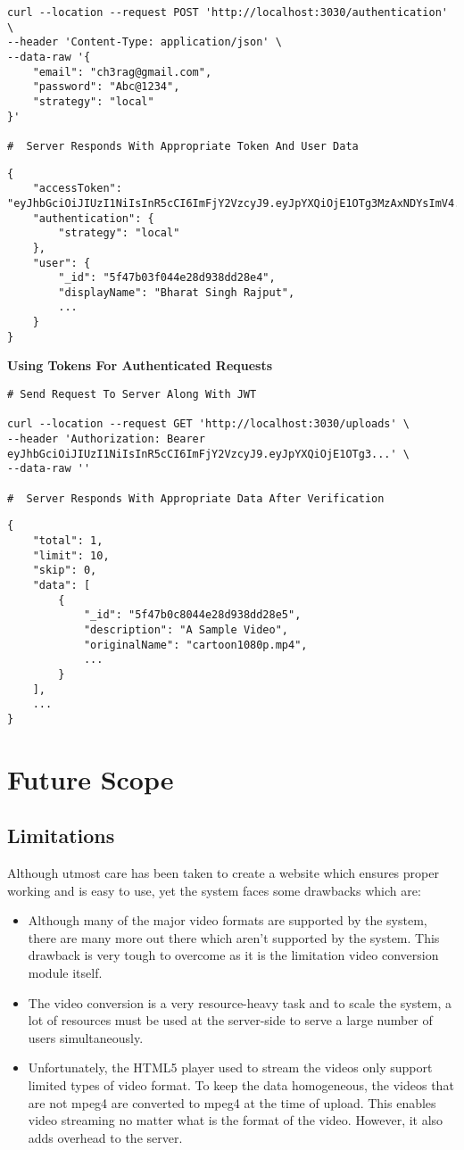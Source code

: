 \begin{itemize}
\begin{verbatim}
curl --location --request POST 'http://localhost:3030/authentication' \
--header 'Content-Type: application/json' \
--data-raw '{
	"email": "ch3rag@gmail.com",
	"password": "Abc@1234",
	"strategy": "local"
}'

#  Server Responds With Appropriate Token And User Data
\end{verbatim}
\begin{verbatim}
{
	"accessToken": "eyJhbGciOiJIUzI1NiIsInR5cCI6ImFjY2VzcyJ9.eyJpYXQiOjE1OTg3MzAxNDYsImV4......",
	"authentication": {
		"strategy": "local"
	},
	"user": {
		"_id": "5f47b03f044e28d938dd28e4",
		"displayName": "Bharat Singh Rajput",
		...
	}
}
\end{verbatim}
\textbf{\small Using Tokens For Authenticated Requests}
\begin{verbatim}
# Send Request To Server Along With JWT

curl --location --request GET 'http://localhost:3030/uploads' \
--header 'Authorization: Bearer eyJhbGciOiJIUzI1NiIsInR5cCI6ImFjY2VzcyJ9.eyJpYXQiOjE1OTg3...' \
--data-raw ''

#  Server Responds With Appropriate Data After Verification
\end{verbatim}
\begin{verbatim}
{
	"total": 1,
	"limit": 10,
	"skip": 0,
	"data": [
		{
			"_id": "5f47b0c8044e28d938dd28e5",
			"description": "A Sample Video",
			"originalName": "cartoon1080p.mp4",
			...
		}
	],
	...
}
\end{verbatim}
\end{itemize}
		\pagebreak
		\section{Future Scope}
\subsection{Limitations}
Although utmost care has been taken to create a website which ensures proper working
and is easy to use, yet the system faces some drawbacks which are:
\begin{itemize}
	\item Although many of the major video formats are supported by the system, there are many more out there which aren't supported by the system. This drawback is very tough to overcome as it is the limitation video conversion module itself.
	
	\item The video conversion is a very resource-heavy task and to scale the system, a lot of resources must be used at the server-side to serve a large number of users simultaneously.
	
	\item Unfortunately, the HTML5 player used to stream the videos only support limited types of video format. To keep the data homogeneous, the videos that are not mpeg4 are converted to mpeg4 at the time of upload. This enables video streaming no matter what is the format of the video. However, it also adds overhead to the server.
\end{itemize}
